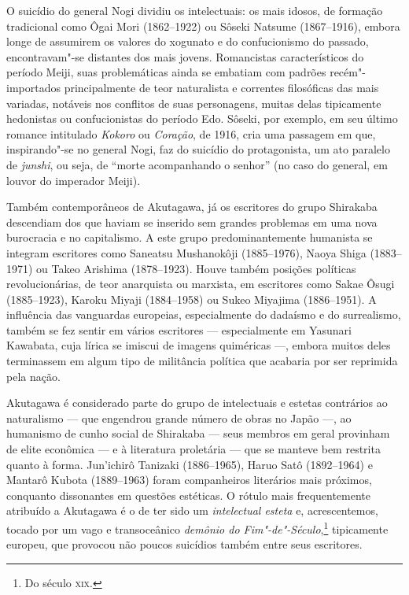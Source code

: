 O suicídio do general Nogi dividiu os intelectuais: os mais idosos, de
formação tradicional como Ôgai Mori (1862--1922) ou  Sôseki Natsume
(1867--1916), embora longe de assumirem os valores do xogunato e do
confucionismo do passado, encontravam"-se distantes dos mais jovens.
Romancistas característicos do período Meiji, suas problemáticas ainda
se embatiam com padrões recém"-importados principalmente de teor
naturalista e correntes filosóficas das mais variadas, notáveis nos
conflitos de suas personagens, muitas delas tipicamente hedonistas ou
confucionistas do período Edo. Sôseki, por exemplo, em seu último
romance intitulado \textit{Kokoro} ou \textit{Coração}, de 1916, cria uma
passagem em que, inspirando"-se no general Nogi, faz do suicídio do
protagonista, um ato paralelo de \textit{junshi}, ou seja, de ``morte
acompanhando o senhor'' (no caso do general, em louvor do imperador Meiji).

Também contemporâneos de Akutagawa, já os escritores do grupo Shirakaba
descendiam dos que haviam se inserido sem grandes problemas em uma nova
burocracia e no capitalismo. A este grupo predominantemente humanista
se integram escritores como Saneatsu Mushanokôji (1885--1976), Naoya Shiga 
(1883--1971) ou Takeo Arishima (1878--1923). Houve também posições
políticas revolucionárias, de teor anarquista ou marxista, em
escritores como Sakae Ôsugi  (1885--1923), Karoku Miyaji (1884--1958) ou
Sukeo Miyajima  (1886--1951). A influência das vanguardas europeias,
especialmente do dadaísmo e do surrealismo, também se fez sentir em
vários escritores --- especialmente em Yasunari Kawabata, cuja lírica se
imiscui de imagens quiméricas ---, embora muitos deles terminassem em algum tipo
de militância política que acabaria por ser reprimida pela nação.

Akutagawa é considerado parte do grupo de intelectuais e estetas
contrários ao naturalismo --- que engendrou grande número de obras no
Japão ---, ao humanismo de cunho social de Shirakaba --- seus membros em
geral provinham de elite econômica --- e à literatura proletária --- que se
manteve bem restrita quanto à forma. Jun'ichirô Tanizaki  (1886--1965),
Haruo Satô  (1892--1964) e Mantarô Kubota  (1889--1963) foram companheiros
literários mais próximos, conquanto dissonantes em questões estéticas. O
rótulo mais frequentemente atribuído a Akutagawa é o de ter sido 
um \textit{intelectual esteta} e, acrescentemos, tocado por um vago e transoceânico 
\textit{demônio do Fim"-de"-Século},\footnote{Do século \textsc{xix}.} tipicamente europeu, 
que provocou não poucos suicídios também entre seus escritores.

